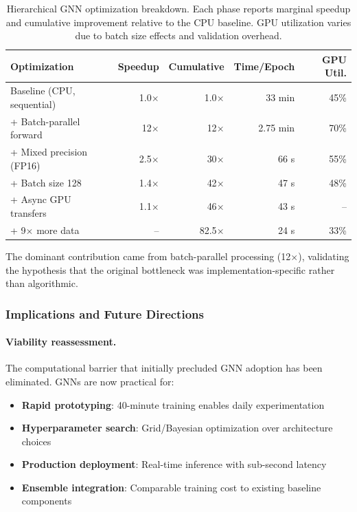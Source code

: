 \begin{table}[ht]
\centering
\begin{tabular}{lrrrr}
\toprule
\textbf{Optimization} & \textbf{Speedup} & \textbf{Cumulative} & \textbf{Time/Epoch} & \textbf{GPU Util.} \\
\midrule
Baseline (CPU, sequential) & 1.0$\times$ & 1.0$\times$ & 33 min & 45\% \\
+ Batch-parallel forward & 12$\times$ & 12$\times$ & 2.75 min & 70\% \\
+ Mixed precision (FP16) & 2.5$\times$ & 30$\times$ & 66 s & 55\% \\
+ Batch size 128 & 1.4$\times$ & 42$\times$ & 47 s & 48\% \\
+ Async GPU transfers & 1.1$\times$ & 46$\times$ & 43 s & -- \\
+ 9$\times$ more data & -- & 82.5$\times$\footnotemark & 24 s & 33\% \\
\bottomrule
\end{tabular}
\caption{Hierarchical GNN optimization breakdown. Each phase reports marginal speedup and cumulative improvement relative to the CPU baseline. GPU utilization varies due to batch size effects and validation overhead.}
\label{tab:gnn_optimization_breakdown}
\end{table}

The dominant contribution came from batch-parallel processing (12$\times$), validating the hypothesis that the original bottleneck was implementation-specific rather than algorithmic.

\subsubsection{Implications and Future Directions}

\paragraph{Viability reassessment.} The computational barrier that initially precluded GNN adoption has been eliminated. GNNs are now practical for:
\begin{itemize}
    \item \textbf{Rapid prototyping}: 40-minute training enables daily experimentation
    \item \textbf{Hyperparameter search}: Grid/Bayesian optimization over architecture choices
    \item \textbf{Production deployment}: Real-time inference with sub-second latency
    \item \textbf{Ensemble integration}: Comparable training cost to existing baseline components
\end{itemize}

